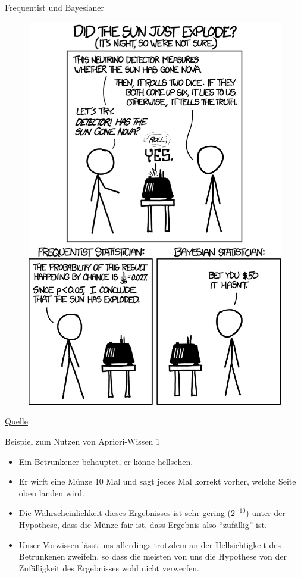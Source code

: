 \documentclass[
  ngerman,
  ignorenonframetext,
]{beamer}
\begin{document}
\begin{frame}{Frequentist und Bayesianer}
\protect\hypertarget{frequentist-und-bayesianer}{}
\begin{figure}[H]
\includegraphics[width=0.7\linewidth]{img/frequentists-vs-bayesians-2x} \end{figure}

\href{https://xkcd.com/1132/}{Quelle}
\end{frame}

\begin{frame}{Beispiel zum Nutzen von Apriori-Wissen 1}
\protect\hypertarget{beispiel-zum-nutzen-von-apriori-wissen-1}{}
\begin{itemize}
\item
  Ein Betrunkener behauptet, er könne hellsehen.
\item
  Er wirft eine Münze 10 Mal und sagt jedes Mal korrekt vorher, welche
  Seite oben landen wird.
\item
  Die Wahrscheinlichkeit dieses Ergebnisses ist sehr gering
  (\(2^{-10}\)) unter der Hypothese, dass die Münze fair ist, dass
  Ergebnis also ``zufällig'' ist.
\item
  Unser Vorwissen lässt uns allerdings trotzdem an der Hellsichtigkeit
  des Betrunkenen zweifeln, so dass die meisten von uns die Hypothese
  von der Zufälligkeit des Ergebnisses wohl nicht verwerfen.
\end{itemize}
\end{frame}
\end{document}
